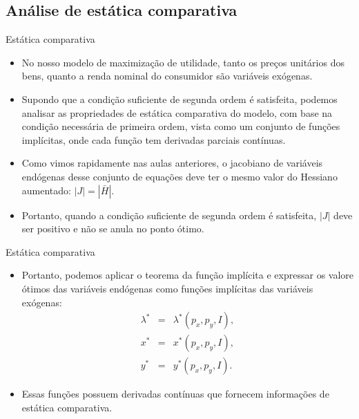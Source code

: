\documentclass[10pt]{beamer}
\begin{document}
\subsection{Análise de estática comparativa}
\begin{frame}{Estática comparativa}
    \begin{itemize}
        \item No nosso modelo de maximização de utilidade, tanto os preços unitários dos bens, quanto a renda nominal do consumidor são variáveis exógenas.
        \bigskip
        \item Supondo que a condição suficiente de segunda ordem é satisfeita, podemos analisar as propriedades de estática comparativa do modelo, com base na condição necessária de primeira ordem, vista como um conjunto de funções implícitas, onde cada função tem derivadas parciais contínuas.
        \bigskip
        \item Como vimos rapidamente nas aulas anteriores, o jacobiano de variáveis endógenas desse conjunto de equações deve ter o mesmo valor do Hessiano aumentado: $|J| = |\bar{H}|$.
        \bigskip
        \item Portanto, quando a condição suficiente de segunda ordem é satisfeita, $|J|$ deve ser positivo e não se anula no ponto ótimo.
    \end{itemize}
\end{frame}

\begin{frame}{Estática comparativa}
\begin{itemize}
    \item Portanto, podemos aplicar o teorema da função implícita e expressar os valore ótimos das variáveis endógenas como funções implícitas das variáveis exógenas:
    \begin{eqnarray}
    \lambda^* &=& \lambda^*(p_x,p_y,I), \nonumber \\
    x^* &=& x^*(p_x,p_y,I), \nonumber \\
    y^*&=& y^*(p_x,p_y,I). \nonumber
    \end{eqnarray}
    \bigskip
    \item Essas funções possuem derivadas contínuas que fornecem informações de estática comparativa.
\end{itemize}
\end{frame}
\end{document}
